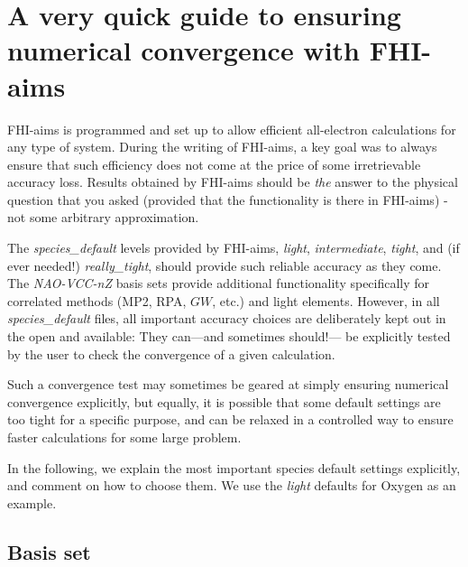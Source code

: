 \section{A very quick guide to ensuring numerical convergence with FHI-aims}

FHI-aims is programmed and set up to allow efficient all-electron calculations
for any type of system. During the writing of FHI-aims, a key goal was to
always ensure that such efficiency does not come at the price of some
irretrievable accuracy loss. Results obtained by FHI-aims should be
\emph{the} answer to the physical question that you asked (provided that the
functionality is there in FHI-aims) - not some arbitrary approximation. 

The \emph{species\_default} levels provided by FHI-aims, \emph{light},
\emph{intermediate},  
\emph{tight}, and (if ever needed!) \emph{really\_tight}, should provide such
reliable accuracy as they come. The \emph{NAO-VCC-nZ} basis sets
provide additional functionality specifically for correlated methods
(MP2, RPA, $GW$, etc.) and light elements. However, in all
\emph{species\_default} files, all important accuracy choices are
deliberately kept out in the open and available: They can---and
sometimes should!--- be explicitly tested by the user to check the
convergence of a given calculation.  

Such a convergence test may sometimes be geared at simply
ensuring numerical convergence explicitly, but equally, it is possible that
some default settings are too tight for a specific purpose, and can be
relaxed in a controlled way to ensure faster calculations for some large
problem. 

In the following, we explain the most important species default settings
explicitly, and comment on how to choose them. We use the \emph{light}
defaults for Oxygen as an example.

\subsection{Basis set}

